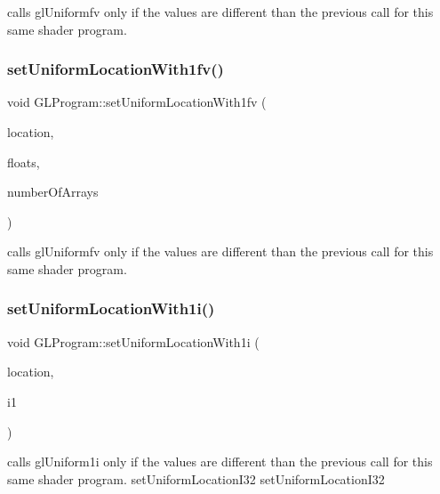 calls gl\+Uniformfv only if the values are different than the previous call for this same shader program. \mbox{\label{classGLProgram_adeb93361bb46fed7496618d46cd2c176}} 
\subsubsection{\texorpdfstring{set\+Uniform\+Location\+With1fv()}{setUniformLocationWith1fv()}\hspace{0.1cm}{\footnotesize\ttfamily [2/2]}}
{\footnotesize\ttfamily void G\+L\+Program\+::set\+Uniform\+Location\+With1fv (\begin{DoxyParamCaption}\item[{G\+Lint}]{location,  }\item[{const G\+Lfloat $\ast$}]{floats,  }\item[{unsigned int}]{number\+Of\+Arrays }\end{DoxyParamCaption})}

calls gl\+Uniformfv only if the values are different than the previous call for this same shader program. \mbox{\label{classGLProgram_afa360f891bfeb78a7c243b79ae549325}} 
\subsubsection{\texorpdfstring{set\+Uniform\+Location\+With1i()}{setUniformLocationWith1i()}\hspace{0.1cm}{\footnotesize\ttfamily [1/2]}}
{\footnotesize\ttfamily void G\+L\+Program\+::set\+Uniform\+Location\+With1i (\begin{DoxyParamCaption}\item[{G\+Lint}]{location,  }\item[{G\+Lint}]{i1 }\end{DoxyParamCaption})}

calls gl\+Uniform1i only if the values are different than the previous call for this same shader program.  set\+Uniform\+Location\+I32  set\+Uniform\+Location\+I32 \mbox{\label{classGLProgram_afa360f891bfeb78a7c243b79ae549325}} 
